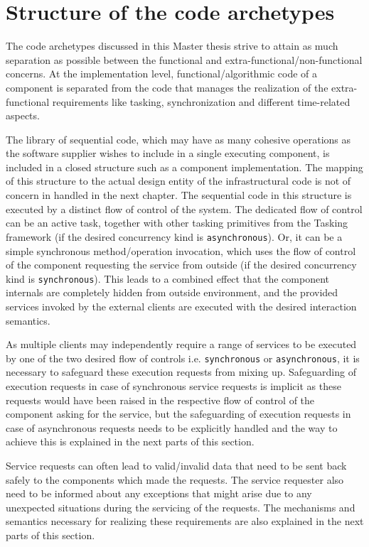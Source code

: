 \section{Structure of the code archetypes}
The code archetypes discussed in this Master thesis strive to attain as much separation as possible between the functional and extra-functional/non-functional concerns. At the implementation level, functional/algorithmic code of a component is separated from the code that manages the realization of the extra-functional requirements like tasking, synchronization and different time-related aspects.

The library of sequential code, which may have as many cohesive operations as the software supplier wishes to include in a single executing component, is included in a closed structure such as a component implementation. The mapping of this structure to the actual design entity of the infrastructural code is not of concern in handled in the next chapter. The sequential code in this structure is executed by a distinct flow of control of the system. The dedicated flow of control can be an active task, together with other tasking primitives from the Tasking framework (if the desired concurrency kind is \texttt{asynchronous}). Or, it can be a simple synchronous method/operation invocation, which uses the flow of control of the component requesting the service from outside (if the desired concurrency kind is \texttt{synchronous}). This leads to a combined effect that the component internals are completely hidden from outside environment, and the provided services invoked by the external clients are executed with the desired interaction semantics.

As multiple clients may independently require a range of services to be executed by one of the two desired flow of controls i.e. \texttt{synchronous} or \texttt{asynchronous}, it is necessary to safeguard these execution requests from mixing up. Safeguarding of execution requests in case of synchronous service requests is implicit as these requests would have been raised in the respective flow of control of the component asking for the service, but the safeguarding of execution requests in case of asynchronous requests needs to be explicitly handled and the way to achieve this is explained in the next parts of this section.

Service requests can often lead to valid/invalid data that need to be sent back safely to the components which made the requests. The service requester also need to be informed about any exceptions that might arise due to any unexpected situations during the servicing of the requests. The mechanisms and semantics necessary for realizing these requirements are also explained in the next parts of this section. 

